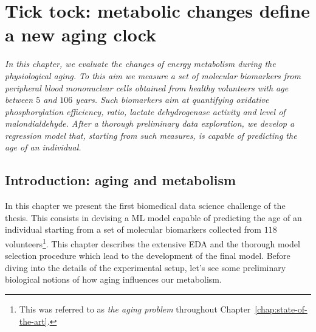 
\chapter{Tick tock: metabolic changes define a new aging clock} \label{chap:frassoni}


\begin{displayquote}
	\textit{In this chapter, we evaluate the changes of energy metabolism during the physiological aging. To this aim we measure a set of molecular biomarkers from peripheral blood mononuclear cells obtained from healthy volunteers with age between $5$ and $106$ years. Such biomarkers aim at quantifying oxidative phosphorylation efficiency, \atpamp ratio, lactate dehydrogenase activity and level of malondialdehyde. After a thorough preliminary data exploration, we develop a regression model that, starting from such measures, is capable of predicting the age of an individual.}
\end{displayquote}

\section{Introduction: aging and metabolism} \label{sec:frassoni_intro}

In this chapter we present the first biomedical data science challenge of the thesis.
This consists in devising a ML model capable of predicting the age of an individual starting from a set of molecular biomarkers collected from $118$ volunteers\footnote{ This was referred to as \textit{the aging problem} throughout Chapter~\ref{chap:state-of-the-art}.}.
This chapter describes the extensive EDA and the thorough model selection procedure which lead to the development of the final model.
Before diving into the details of the experimental setup, let's see some preliminary biological notions of how aging influences our metabolism.

